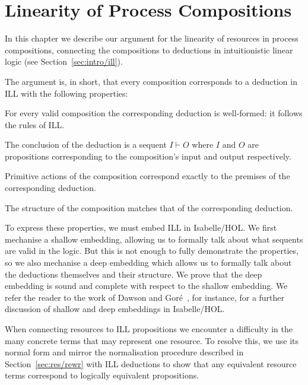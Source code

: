 \documentclass[class=smolathesis,crop=false]{standalone}
\begin{document}
\chapter{Linearity of Process Compositions}
\label{ch:linearity}

In this chapter we describe our argument for the linearity of resources in process compositions, connecting the compositions to deductions in intuitionistic linear logic (see Section~\ref{sec:intro/ill}).

The argument is, in short, that every composition corresponds to a deduction in ILL with the following properties:
\begin{description}[style=nextline]
  \item[Well-formedness] For every valid composition the corresponding deduction is well-formed: it follows the rules of ILL\@.
  \item[Input-Output Correspondence] The conclusion of the deduction is a sequent $I \vdash O$ where $I$ and $O$ are propositions corresponding to the composition's input and output respectively.
  \item[Primitive Correspondence] Primitive actions of the composition correspond exactly to the premises of the corresponding deduction.
  \item[Structural Correspondence] The structure of the composition matches that of the corresponding deduction.
\end{description}

To express these properties, we must embed ILL in Isabelle/HOL\@.
We first mechanise a shallow embedding, allowing us to formally talk about what sequents are valid in the logic.
But this is not enough to fully demonstrate the properties, so we also mechanise a deep embedding which allows us to formally talk about the deductions themselves and their structure.
We prove that the deep embedding is sound and complete with respect to the shallow embedding.
We refer the reader to the work of Dawson and Gor\'e~\cite{dawson_gore-2010}, for instance, for a further discussion of shallow and deep embeddings in Isabelle/HOL\@.

When connecting resources to ILL propositions we encounter a difficulty in the many concrete terms that may represent one resource.
To resolve this, we use its normal form and mirror the normalisation procedure described in Section~\ref{sec:res/rewr} with ILL deductions to show that any equivalent resource terms correspond to logically equivalent propositions.
\end{document}
